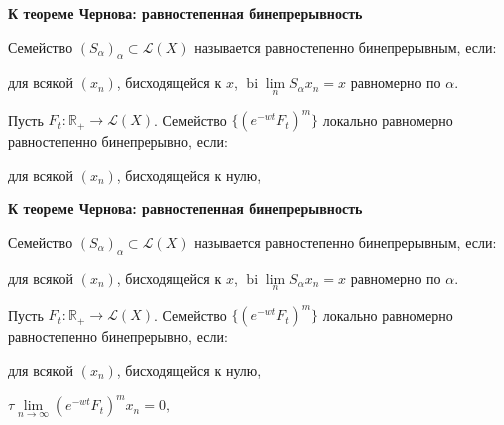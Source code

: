 \documentclass[11pt]{article}
\newcommand{\R}{\mathbb{R}}
\begin{document}
\begin{center}
{\color{notaeYELLOW}\bfseries\fontsize{44}{52}\selectfont К теореме Чернова: равностепенная бинепрерывность}
\end{center}
\vspace*{\fill}
\begin{center}
\fontsize{36}{43}\selectfont
\parbox{\linewidth}{\centering\noindent Семейство $(S_\alpha)_\alpha\subset\mathcal{L}(X)$ называется равностепенно бинепрерывным, если:
\par}\vspace{0.4in}
\parbox{\linewidth}{\centering\noindent для всякой $(x_n)$, бисходящейся к $x$, $\operatorname{bi}\lim\limits_n S_\alpha x_n=x$ равномерно по $\alpha$.
\par}\vspace{0.4in}
\parbox{\linewidth}{\centering\noindent Пусть $F_t:\R_+\to\mathcal{L}(X)$. Семейство $\{(e^{-wt}F_t)^m\}$ локально равномерно равностепенно бинепрерывно, если:
\par}\vspace{0.4in}
\parbox{\linewidth}{\centering\noindent для всякой $(x_n)$, бисходящейся к нулю,
\par}\vspace{0.4in}
\end{center}
\vspace*{\fill}

\newpage

\begin{center}
{\color{notaeYELLOW}\bfseries\fontsize{44}{52}\selectfont К теореме Чернова: равностепенная бинепрерывность}
\end{center}
\vspace*{\fill}
\begin{center}
\fontsize{36}{43}\selectfont
\parbox{\linewidth}{\centering\noindent Семейство $(S_\alpha)_\alpha\subset\mathcal{L}(X)$ называется равностепенно бинепрерывным, если:
\par}\vspace{0.4in}
\parbox{\linewidth}{\centering\noindent для всякой $(x_n)$, бисходящейся к $x$, $\operatorname{bi}\lim\limits_n S_\alpha x_n=x$ равномерно по $\alpha$.
\par}\vspace{0.4in}
\parbox{\linewidth}{\centering\noindent Пусть $F_t:\R_+\to\mathcal{L}(X)$. Семейство $\{(e^{-wt}F_t)^m\}$ локально равномерно равностепенно бинепрерывно, если:
\par}\vspace{0.4in}
\parbox{\linewidth}{\centering\noindent для всякой $(x_n)$, бисходящейся к нулю,
\par}\vspace{0.4in}
\parbox{\linewidth}{\centering\noindent $\tau\lim\limits_{n\to\infty}(e^{-wt}F_t)^m x_n=0,$
\par}\vspace{0.4in}
\end{center}
\vspace*{\fill}
\end{document}
